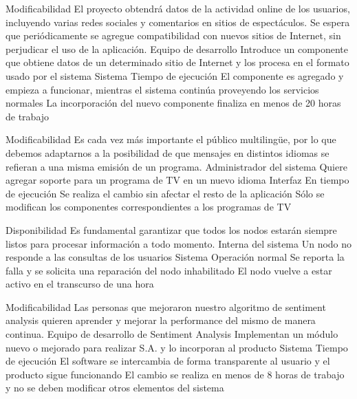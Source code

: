   \begin{enumerate}

\QA
  {Modificabilidad} %
  {El proyecto obtendrá datos de la actividad online de los usuarios, incluyendo varias redes sociales y comentarios en sitios de espectáculos. Se espera que periódicamente se agregue compatibilidad con nuevos sitios de Internet, sin perjudicar el uso de la aplicación.} %
  {Equipo de desarrollo} %
  {Introduce un componente que obtiene datos de un determinado sitio de Internet y los procesa en el formato usado por el sistema} %
  {Sistema} %
  {Tiempo de ejecución} %
  {El componente es agregado y empieza a funcionar, mientras el sistema continúa proveyendo los servicios normales} %
  {La incorporación del nuevo componente finaliza en menos de 20 horas de trabajo} %

\QA
  {Modificabilidad} %
  {Es cada vez más importante el público multilingüe, por lo que debemos adaptarnos a la posibilidad de que mensajes en distintos idiomas se refieran a una misma emisión de un programa.} %
  {Administrador del sistema} %
  {Quiere agregar soporte para un programa de TV en un nuevo idioma} %
  {Interfaz} %
  {En tiempo de ejecución} %
  {Se realiza el cambio sin afectar el resto de la aplicación} %
  {Sólo se modifican los componentes correspondientes a los programas de TV} %

\QA
  {Disponibilidad} %
  {Es fundamental garantizar que todos los nodos estarán siempre listos para procesar información a todo momento.} %
  {Interna del sistema} %
  {Un nodo no responde a las consultas de los usuarios} %
  {Sistema} %
  {Operación normal} %
  {Se reporta la falla y se solicita una reparación del nodo inhabilitado} %
  {El nodo vuelve a estar activo en el transcurso de una hora} %

\QA
  {Modificabilidad} %
  {Las personas que mejoraron nuestro algoritmo de sentiment analysis quieren aprender y mejorar la performance del mismo de manera continua.} %
  {Equipo de desarrollo de Sentiment Analysis} %
  {Implementan un módulo nuevo o mejorado para realizar S.A. y lo incorporan al producto} %
  {Sistema} %
  {Tiempo de ejecución} %
  {El software se intercambia de forma transparente al usuario y el producto sigue funcionando} %
  {El cambio se realiza en menos de 8 horas de trabajo y no se deben modificar otros elementos del sistema} %


\end{enumerate}
